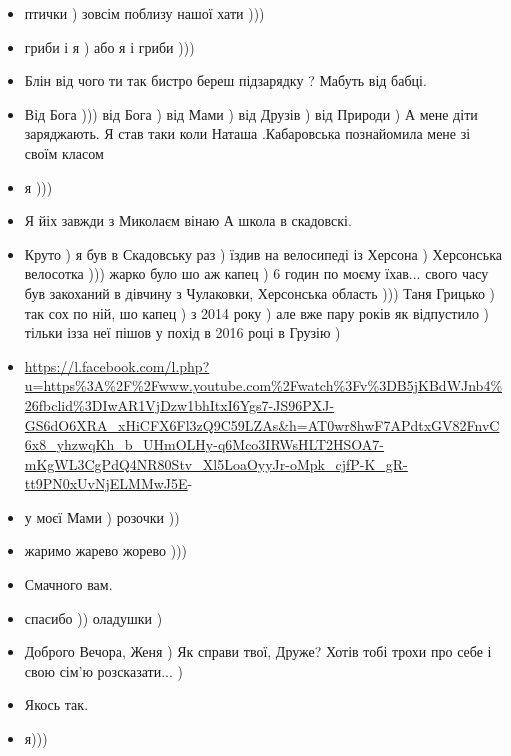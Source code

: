 \begin{itemize}
\item птички ) зовсім поблизу нашої хати )))
\item гриби і я ) або я і гриби )))
\item Блін від чого ти так бистро береш підзарядку ?
Мабуть від бабці.
\item Від Бога ))) від Бога ) від Мами ) від Друзів ) від Природи )
				А мене діти заряджають.
Я став таки коли Наташа .Кабаровська познайомила мене зі своїм класом
\item я )))
\item Я йіх завжди з Миколаєм вінаю
А школа в скадовскі.
\item Круто ) я був в Скадовську раз ) їздив на велосипеді із Херсона )
				Херсонська велосотка ))) жарко було шо аж капец ) 6 годин по моєму
				їхав...  свого часу був закоханий в дівчину з Чулаковки, Херсонська
				область ))) Таня Грицько ) так сох по ній, шо капец ) з 2014 року ) але
				вже пару років як відпустило ) тільки ізза неї пішов у похід в 2016
				році в Грузію )
\item \url{https://l.facebook.com/l.php?u=https%3A%2F%2Fwww.youtube.com%2Fwatch%3Fv%3DB5jKBdWJnb4%26fbclid%3DIwAR1VjDzw1bhItxI6Ygs7-JS96PXJ-GS6dO6XRA_xHiCFX6Fl3zQ9C59LZAs&h=AT0wr8hwF7APdtxGV82FnvC6x8_yhzwqKh_b_UHmOLHy-q6Mco3IRWsHLT2HSOA7-mKgWL3CgPdQ4NR80Stv_Xl5LoaOyyJr-oMpk_cjfP-K_gR-tt9PN0xUvNjELMMwJ5E}-
\item у моєї Мами ) розочки ))
\item жаримо жарево жорево )))
\item Смачного вам.
\item спасибо )) оладушки )
\item Доброго Вечора, Женя ) Як справи твої, Друже? Хотів тобі трохи про себе і свою сім'ю розсказати... )
\item Якось так.
\item я)))

  
\end{itemize}
